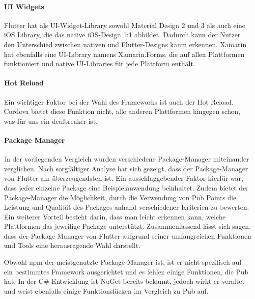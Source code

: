 \paragraph{UI Widgets}
\newline

Flutter hat als UI-Widget-Library sowohl Material Design 2 und 3 als auch eine iOS Library, die das native iOS-Design 1:1 abbildet. Dadurch kann der Nutzer den Unterschied zwischen nativen und Flutter-Designs kaum erkennen. Xamarin hat ebenfalls eine UI-Library namens Xamarin.Forms, die auf allen Plattformen funktioniert und native UI-Libraries für jede Plattform enthält.

\paragraph{Hot Reload}
\newline

Ein wichtiger Faktor bei der Wahl des Frameworks ist auch der Hot Reload. Cordova bietet diese Funktion nicht, alle anderen Plattformen hingegen schon, was für uns ein dealbreaker ist.

\paragraph{Package Manager}
\newline

In der vorliegenden Vergleich wurden verschiedene Package-Manager miteinander verglichen. Nach sorgfältiger Analyse hat sich gezeigt, dass der Package-Manager von Flutter am überzeugendsten ist. Ein ausschlaggebender Faktor hierfür war, dass jeder einzelne Package eine Beispielanwendung beinhaltet. Zudem bietet der Package-Manager die Möglichkeit, durch die Verwendung von Pub Points die Leistung und Qualität des Packages anhand verschiedener Kriterien zu bewerten. Ein weiterer Vorteil besteht darin, dass man leicht erkennen kann, welche Plattformen das jeweilige Package unterstützt. Zusammenfassend lässt sich sagen, dass der Package-Manager von Flutter aufgrund seiner umfangreichen Funktionen und Tools eine herausragende Wahl darstellt.


Obwohl npm der meistgenutzte Package-Manager ist, ist er nicht spezifisch auf ein bestimmtes Framework ausgerichtet und es fehlen einige Funktionen, die Pub hat. In der C\#-Entwicklung ist NuGet bereits bekannt, jedoch wirkt er veraltet und weist ebenfalls einige Funktionslücken im Vergleich zu Pub auf.

